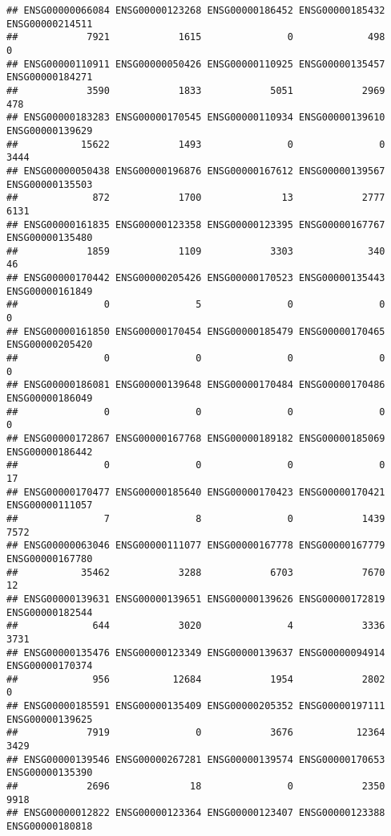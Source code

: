 \documentclass[
]{article}
\begin{document}
\begin{verbatim}
## ENSG00000066084 ENSG00000123268 ENSG00000186452 ENSG00000185432 ENSG00000214511 
##            7921            1615               0             498               0 
## ENSG00000110911 ENSG00000050426 ENSG00000110925 ENSG00000135457 ENSG00000184271 
##            3590            1833            5051            2969             478 
## ENSG00000183283 ENSG00000170545 ENSG00000110934 ENSG00000139610 ENSG00000139629 
##           15622            1493               0               0            3444 
## ENSG00000050438 ENSG00000196876 ENSG00000167612 ENSG00000139567 ENSG00000135503 
##             872            1700              13            2777            6131 
## ENSG00000161835 ENSG00000123358 ENSG00000123395 ENSG00000167767 ENSG00000135480 
##            1859            1109            3303             340              46 
## ENSG00000170442 ENSG00000205426 ENSG00000170523 ENSG00000135443 ENSG00000161849 
##               0               5               0               0               0 
## ENSG00000161850 ENSG00000170454 ENSG00000185479 ENSG00000170465 ENSG00000205420 
##               0               0               0               0               0 
## ENSG00000186081 ENSG00000139648 ENSG00000170484 ENSG00000170486 ENSG00000186049 
##               0               0               0               0               0 
## ENSG00000172867 ENSG00000167768 ENSG00000189182 ENSG00000185069 ENSG00000186442 
##               0               0               0               0              17 
## ENSG00000170477 ENSG00000185640 ENSG00000170423 ENSG00000170421 ENSG00000111057 
##               7               8               0            1439            7572 
## ENSG00000063046 ENSG00000111077 ENSG00000167778 ENSG00000167779 ENSG00000167780 
##           35462            3288            6703            7670              12 
## ENSG00000139631 ENSG00000139651 ENSG00000139626 ENSG00000172819 ENSG00000182544 
##             644            3020               4            3336            3731 
## ENSG00000135476 ENSG00000123349 ENSG00000139637 ENSG00000094914 ENSG00000170374 
##             956           12684            1954            2802               0 
## ENSG00000185591 ENSG00000135409 ENSG00000205352 ENSG00000197111 ENSG00000139625 
##            7919               0            3676           12364            3429 
## ENSG00000139546 ENSG00000267281 ENSG00000139574 ENSG00000170653 ENSG00000135390 
##            2696              18               0            2350            9918 
## ENSG00000012822 ENSG00000123364 ENSG00000123407 ENSG00000123388 ENSG00000180818 

\end{verbatim}
\end{document}
